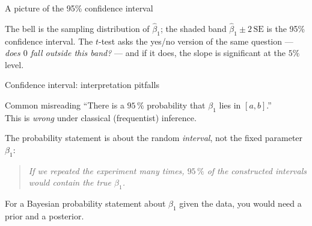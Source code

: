 \documentclass[aspectratio=169,11pt]{beamer}
\begin{document}
\begin{frame}{A picture of the 95\% confidence interval}
  \begin{center}
  \end{center}
  \begin{takeaway}
    The bell is the sampling distribution of $\hat\beta_1$; the shaded
    band $\hat\beta_1\pm 2\,\mathrm{SE}$ is the 95\% confidence interval.
    The $t$-test asks the yes/no version of the same question ---
    \emph{does $0$ fall outside this band?} --- and if it does, the slope
    is significant at the $5\%$ level.
  \end{takeaway}
\end{frame}

\begin{frame}{Confidence interval: interpretation pitfalls}
  \begin{alertblock}{Common misreading}
    ``There is a $95\,\%$ probability that $\beta_1$ lies in $[a, b]$.''
    \\[2pt]
    This is \emph{wrong} under classical (frequentist) inference.
  \end{alertblock}
  \begin{readme}
    The probability statement is about the random \emph{interval}, not
    the fixed parameter $\beta_1$:
    \begin{quote}
      \emph{If we repeated the experiment many times, $95\,\%$ of the
      constructed intervals would contain the true $\beta_1$.}
    \end{quote}
    For a Bayesian probability statement about $\beta_1$ given the
    data, you would need a prior and a posterior.
  \end{readme}
\end{frame}
\end{document}
